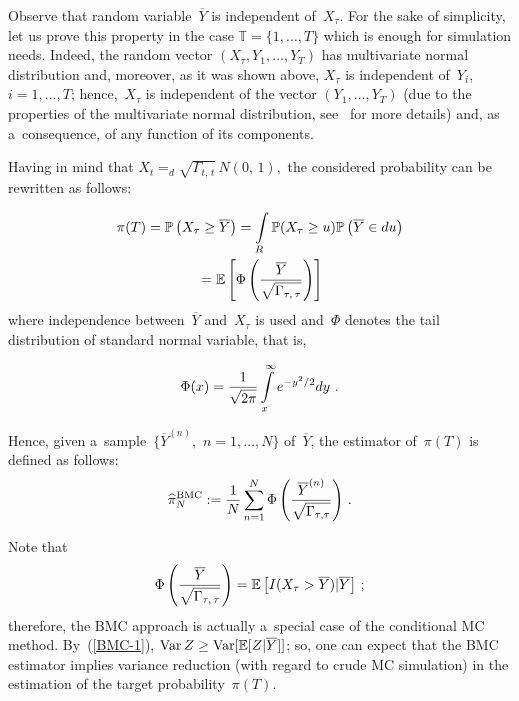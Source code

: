 \begin{multicols}{2}
Observe that random variable~$\overline{Y}$ is independent of~$X_{\tau}$. 
For the sake of simplicity, let us prove this property in the case 
$\mathbb{T}=\{1,\ldots,T\}$ which is enough for simulation needs. Indeed, 
the random vector $(X_{\tau},Y_1,\ldots,Y_T)$ has multivariate normal distribution 
and, moreover, as it was shown above, $X_{\tau}$ is independent of~$Y_i$,
$i=1,\ldots,T$; hence,~$X_{\tau}$ is independent of the vector $(Y_1,\ldots,Y_T)$ 
(due to the properties of the multivariate normal distribution, see~\cite{Gut} 
for more details) and, as a~consequence, of any function of its components.

Having in mind that
$
X_t =_d \sqrt{\Gamma_{t,\,t}}\,N(0,\,1),
$
the  considered
probability can be rewritten as follows:

\vspace*{-2pt}

\noindent
\begin{multline*}
\pi(T)=\mathbb{P}\left(X_{\tau}\ge\overline{Y}\right)=
\int\limits_R \mathbb{P}(X_{\tau}\ge   u)\mathbb{P}\left(\overline{Y}\in
 du\right)\\
{}=
\mathbb{E}\left[\Phi\left(\displaystyle\frac{\displaystyle \overline{Y}\mathstrut}{\displaystyle  \sqrt{\Gamma_{\tau,\,\tau}}\mathstrut}
\right)\right] 
\end{multline*}
where independence between~$\overline{Y}$ and~$X_{\tau}$ is used and~$\Phi$ 
denotes the tail distribution of standard normal variable, that is,

\noindent
$$
\Phi(x)=\displaystyle\frac{\displaystyle 1\mathstrut}{\displaystyle \sqrt{2\pi}\mathstrut} \int\limits_x^\infty e^{-y^2/2}dy\,\,.
$$

Hence, given a~sample~$\{\overline{Y}^{(n)},\,\,n=1,\ldots,N\}$  of~$\overline{Y}$,
the estimator of~$\pi(T)$ is defined as follows:
\begin{equation*}
\widehat{\pi}_N^{\textrm{BMC}}  :=  \displaystyle\frac{\displaystyle 1\mathstrut}{\displaystyle N\mathstrut}\sum\limits_{n=1}^N
\Phi \left(\displaystyle\frac{\displaystyle \overline{Y}^{(n)}\mathstrut}{\displaystyle \sqrt{\Gamma_{\tau,\tau}}\mathstrut}\right)\,.
\end{equation*}

Note that
\begin{equation*}
\Phi\left(\displaystyle\frac{\displaystyle \overline{Y}\mathstrut}{\displaystyle  \sqrt{\Gamma_{\tau,\,\tau}}\mathstrut}\right)=
\mathbb{E} \left[ I(X_{\tau}>\overline{Y}) | \overline{Y}\right]\,;
\end{equation*}
therefore, the BMC approach is actually a~special case of the conditional MC method. 
By~(\ref{BMC-1}), $\mathrm{Var}\, Z\linebreak\ge  \mathrm{Var} 
[\mathbb{E}[Z|\overline{Y}]]$;
so, one can expect that the BMC estimator implies variance reduction  
(with regard to crude MC simulation) in   the estimation of the target probability~$\pi(T)$.


\end{multicols}
